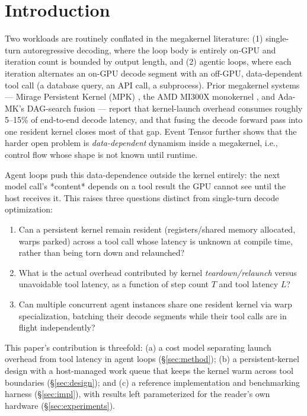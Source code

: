 \documentclass{article}
\begin{document}
\section{Introduction}

Two workloads are routinely conflated in the megakernel literature:
(1) single-turn autoregressive decoding, where the loop body is
entirely on-GPU and iteration count is bounded by output length, and
(2) agentic loops, where each iteration alternates an on-GPU decode
segment with an off-GPU, data-dependent tool call (a database query,
an API call, a subprocess). Prior megakernel systems --- Mirage
Persistent Kernel (MPK) \citep{mpk2025}, the AMD MI300X monokernel
\citep{kog2026}, and Ada-MK's DAG-search fusion \citep{adamk2026} ---
report that kernel-launch overhead consumes roughly 5--15\% of
end-to-end decode latency, and that fusing the decode forward pass
into one resident kernel closes most of that gap. Event Tensor
\citep{eventtensor2026} further shows that the harder open problem is
\emph{data-dependent} dynamism inside a megakernel, i.e., control flow
whose shape is not known until runtime.

Agent loops push this data-dependence outside the kernel entirely: the
next model call's *content* depends on a tool result the GPU cannot
see until the host receives it. This raises three questions distinct
from single-turn decode optimization:

\begin{enumerate}
  \item Can a persistent kernel remain resident (registers/shared
  memory allocated, warps parked) across a tool call whose latency is
  unknown at compile time, rather than being torn down and relaunched?
  \item What is the actual overhead contributed by kernel
  \emph{teardown/relaunch} versus unavoidable tool latency, as a
  function of step count $T$ and tool latency $L$?
  \item Can multiple concurrent agent instances share one resident
  kernel via warp specialization, batching their decode segments while
  their tool calls are in flight independently?
\end{enumerate}

This paper's contribution is threefold: (a) a cost model separating
launch overhead from tool latency in agent loops (\S\ref{sec:method});
(b) a persistent-kernel design with a host-managed work queue that
keeps the kernel warm across tool boundaries (\S\ref{sec:design}); and
(c) a reference implementation and benchmarking harness
(\S\ref{sec:impl}), with results left parameterized for the reader's
own hardware (\S\ref{sec:experiments}).
\end{document}
